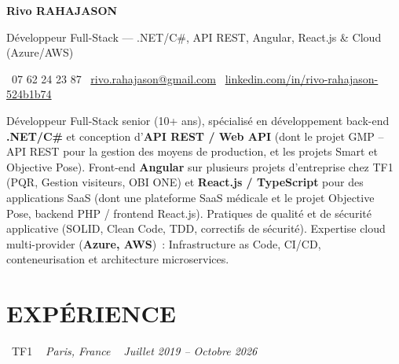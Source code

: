 \documentclass[10pt,a4paper]{article}
\begin{document}
\begin{center}
{\Huge \textbf{\color{ink}Rivo RAHAJASON}}

\vspace{4pt}

{\large \color{primary} Développeur Full-Stack --- .NET/C\#, API REST, Angular, React.js \& Cloud (Azure/AWS)}

\vspace{6pt}

\color{darkgray} \faPhone\  07 62 24 23 87 \quad
\color{darkgray} \faEnvelope\ \href{mailto:rivo.rahajason@gmail.com}{rivo.rahajason@gmail.com} \quad
\color{darkgray} \faLinkedin\ \href{https://linkedin.com/in/rivo-rahajason-524b1b74}{linkedin.com/in/rivo-rahajason-524b1b74}

\vspace{10pt}

\begin{minipage}{\textwidth}
\small\color{darkgray}
Développeur Full-Stack senior (10+ ans), spécialisé en développement back-end \textbf{.NET/C\#} et conception d'\textbf{API REST / Web API} (dont le projet GMP -- API REST pour la gestion des moyens de production, et les projets Smart et Objective Pose). Front-end \textbf{Angular} sur plusieurs projets d'entreprise chez TF1 (PQR, Gestion visiteurs, OBI ONE) et \textbf{React.js / TypeScript} pour des applications SaaS (dont une plateforme SaaS médicale et le projet Objective Pose, backend PHP / frontend React.js). Pratiques de qualité et de sécurité applicative (SOLID, Clean Code, TDD, correctifs de sécurité). Expertise cloud multi-provider (\textbf{Azure, AWS})~: Infrastructure as Code, CI/CD, conteneurisation et architecture microservices.
\end{minipage}

\vspace{16pt}
\end{center}

\section*{EXPÉRIENCE}

\noindent\textcolor{primary}{ \faBuilding\ TF1} \quad
\textit{ \small \textcolor{darkgray}{ \faMapMarker\ } Paris, France } \hfill
\textit{ \small \textcolor{darkgray}{ \faCalendar\ } Juillet 2019 -- Octobre 2026 }
\end{document}
